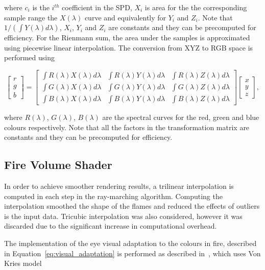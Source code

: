 where $c_i$ is the $i^{th}$ coefficient in the SPD, $X_i$ is area for the the corresponding sample range the $X(\lambda)$ curve and equivalently for $Y_i$ and $Z_i$.
Note that $1 / \left(\int Y(\lambda) d\lambda \right)$, $X_i$, $Y_i$ and $Z_i$ are constants and they can be precomputed for efficiency.
For the Rienmann sum, the area under the samples is approximated using piecewise linear interpolation.
The conversion from XYZ to RGB space is performed using

\begin{equation}
\begin{bmatrix}
r \\
g \\
b
\end{bmatrix}
 = 
\begin{bmatrix}
\int R(\lambda) X(\lambda) d\lambda & \int R(\lambda) Y(\lambda) d\lambda & \int R(\lambda) Z(\lambda) d\lambda \\
\int G(\lambda) X(\lambda) d\lambda & \int G(\lambda) Y(\lambda) d\lambda & \int G(\lambda) Z(\lambda) d\lambda \\
\int B(\lambda) X(\lambda) d\lambda & \int B(\lambda) Y(\lambda) d\lambda & \int B(\lambda) Z(\lambda) d\lambda
\end{bmatrix}
\begin{bmatrix}
x \\
y \\
z
\end{bmatrix},
\end{equation}

where $R(\lambda)$, $G(\lambda)$, $B(\lambda)$ are the spectral curves for the red, green and blue colours respectively.
Note that all the factors in the transformation matrix are constants and they can be precomputed for efficiency.

\subsection{Fire Volume Shader}
\label{sec:fire_volume_shader}

In order to achieve smoother rendering results, a trilinear interpolation is computed in each step in the ray-marching algorithm.
Computing the interpolation smoothed the shape of the flames and reduced the effects of outliers is the input data.
Tricubic interpolation was also considered, however it was discarded due to the significant increase in computational overhead.

The implementation of the eye visual adaptation to the colours in fire, described in Equation~\ref{eq:visual_adaptation} is performed as described in~\cite{Nguyen:2002}, which uses Von Kries model~\cite{Fairchild:2005} 

